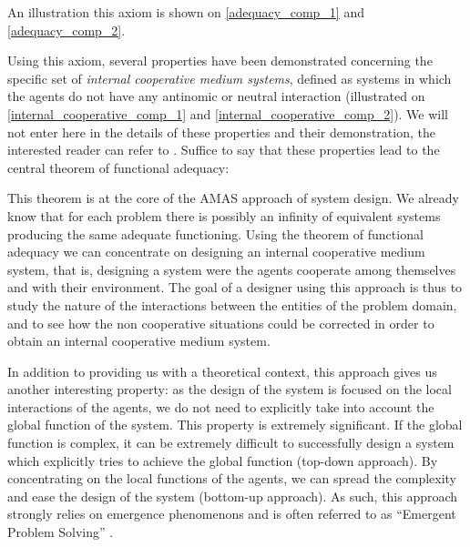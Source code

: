 An illustration this axiom is shown on \figurename{} \ref{adequacy_comp_1} and \figurename{} \ref{adequacy_comp_2}.


Using this axiom, several properties have been demonstrated concerning the specific set of \emph{internal cooperative medium systems}, defined as systems in which the agents do not have any antinomic or neutral interaction (illustrated on \figurename{} \ref{internal_cooperative_comp_1} and \figurename{} \ref{internal_cooperative_comp_2}). We will not enter here in the details of these properties and their demonstration, the interested reader can refer to \cite{glize2001adaptation, gleizes1999theory}. Suffice to say that these properties lead to the central theorem of functional adequacy:


This theorem is at the core of the AMAS approach of system design. We already know that for each problem there is possibly an infinity of equivalent systems producing the same adequate functioning. Using the theorem of functional adequacy we can concentrate on designing an internal cooperative medium system, that is, designing a system were the agents cooperate among themselves and with their environment. The goal of a designer using this approach is thus to study the nature of the interactions between the entities of the problem domain, and to see how the non cooperative situations could be corrected in order to obtain an internal cooperative medium system.

In addition to providing us with a theoretical context, this approach gives us another interesting property: as the design of the system is focused on the local interactions of the agents, we do not need to explicitly take into account the global function of the system. This property is extremely significant. If the global function is complex, it can be extremely difficult to successfully design a system which explicitly tries to achieve the global function (top-down approach). By concentrating on the local functions of the agents, we can spread the complexity and ease the design of the system (bottom-up approach). As such, this approach strongly relies on emergence phenomenons and is often referred to as \enquote{Emergent Problem Solving} \cite{quinqueton2000emergent}.

